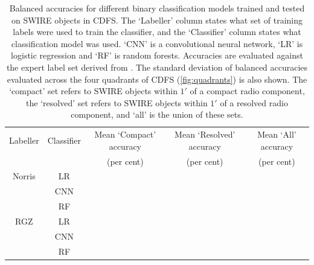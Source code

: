 \documentclass[fleqn,usenatbib,usedcolumn]{mnras}
\begin{document}
  \begin{table}
    \caption{Balanced accuracies for different binary classification models trained and tested on SWIRE objects in CDFS.
    The `Labeller' column states what set of training labels
    were used to train the classifier, and the `Classifier' column states what
    classification model was used. `CNN' is a convolutional neural network,
    `LR' is logistic regression and `RF' is random forests. Accuracies are evaluated against the expert
    label set derived from \citet{norris06}. The standard deviation of balanced accuracies evaluated across the four quadrants of
    CDFS (\autoref{fig:quadrants}) is also shown. The `compact' set refers to SWIRE
    objects within $1'$ of a compact radio component, the `resolved' set refers to
    SWIRE objects within $1'$ of a resolved radio component, and `all' is the union of these sets.}
    \label{tab:cdfs-ba}
    \begin{tabular}{ccccc}
      \hline
      Labeller & Classifier & Mean `Compact' accuracy & Mean `Resolved' accuracy & Mean `All' accuracy\\
       &  & (per cent) & (per cent) & (per cent)\\
      \hline
      Norris & LR & & & \\
             & CNN & & & \\
             & RF & & & \\
      RGZ & LR & & & \\
          & CNN & & & \\
          & RF & & & \\
      \hline
    \end{tabular}
  \end{table}
\end{document}
